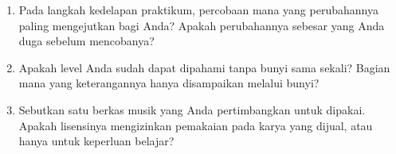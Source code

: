 \begin{refleksibox}
\begin{enumerate}
  \item Pada langkah kedelapan praktikum, percobaan mana yang perubahannya
        paling mengejutkan bagi Anda? Apakah perubahannya sebesar yang Anda
        duga sebelum mencobanya?

  \item Apakah level Anda sudah dapat dipahami tanpa bunyi sama sekali?
        Bagian mana yang keterangannya hanya disampaikan melalui bunyi?

  \item Sebutkan satu berkas musik yang Anda pertimbangkan untuk dipakai.
        Apakah lisensinya mengizinkan pemakaian pada karya yang dijual, atau
        hanya untuk keperluan belajar?
\end{enumerate}
\end{refleksibox}
